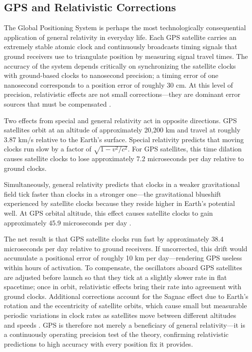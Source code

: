 \documentclass[12pt, a4paper]{article}
\begin{document}
	\subsection{GPS and Relativistic Corrections}
	
	The Global Positioning System is perhaps the most technologically consequential application of general relativity in everyday life. Each GPS satellite carries an extremely stable atomic clock and continuously broadcasts timing signals that ground receivers use to triangulate position by measuring signal travel times. The accuracy of the system depends critically on synchronizing the satellite clocks with ground-based clocks to nanosecond precision; a timing error of one nanosecond corresponds to a position error of roughly 30 cm. At this level of precision, relativistic effects are not small corrections—they are dominant error sources that must be compensated \citep{ashbyRelativityGlobalPositioning2003}.
	
	Two effects from special and general relativity act in opposite directions. GPS satellites orbit at an altitude of approximately 20{,}200 km and travel at roughly 3.87 km/s relative to the Earth's surface. Special relativity predicts that moving clocks run slow by a factor of \(\sqrt{1 - v^2/c^2}\). For GPS satellites, this time dilation causes satellite clocks to lose approximately 7.2 microseconds per day relative to ground clocks.
	
	Simultaneously, general relativity predicts that clocks in a weaker gravitational field tick faster than clocks in a stronger one—the gravitational blueshift experienced by satellite clocks because they reside higher in Earth's potential well. At GPS orbital altitude, this effect causes satellite clocks to gain approximately 45.9 microseconds per day \citep{ashbyRelativityGlobalPositioning2003}.
	
	The net result is that GPS satellite clocks run fast by approximately \(38.4\) microseconds per day relative to ground receivers. If uncorrected, this drift would accumulate a positional error of roughly 10 km per day—rendering GPS useless within hours of activation. To compensate, the oscillators aboard GPS satellites are adjusted before launch so that they tick at a slightly slower rate in flat spacetime; once in orbit, relativistic effects bring their rate into agreement with ground clocks. Additional corrections account for the Sagnac effect due to Earth's rotation and the eccentricity of satellite orbits, which cause small but measurable periodic variations in clock rates as satellites move between different altitudes and speeds \citep{ashbyRelativityGlobalPositioning2003}. GPS is therefore not merely a beneficiary of general relativity—it is a continuously operating precision test of the theory, confirming relativistic predictions to high accuracy with every position fix it provides.
	
\end{document}
